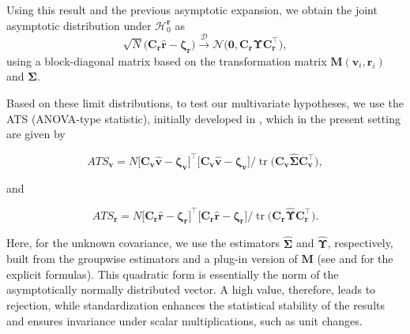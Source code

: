 Using this result and the previous asymptotic expansion, we obtain the joint
asymptotic distribution under \(\mathcal{H}_0^{\boldsymbol{r}}\) as
\begin{equation}
\sqrt{N}
\bigl(
\boldsymbol{C}_{\boldsymbol{r}} \widehat{\boldsymbol{r}}
- \boldsymbol{\zeta}_{\boldsymbol{r}}
\bigr)
\stackrel{\mathcal D}{\longrightarrow}
\mathcal{N}
\bigl(
\mathbf{0},
\boldsymbol{C}_{\boldsymbol{r}} \boldsymbol{\Upsilon} \boldsymbol{C}_{\boldsymbol{r}}^\top
\bigr),
\label{eq:cor-limit}
\end{equation}
using a block-diagonal matrix based on the transformation matrix
\(\boldsymbol{M}(\boldsymbol{v}_i, \boldsymbol{r}_i)\) and \(\boldsymbol{\Sigma}\).

Based on these limit distributions, to test our multivariate hypotheses, we use
the ATS (ANOVA-type statistic), initially developed in
\citet{brunner1997}, which in the present setting are given by

\begin{equation}
ATS_{\boldsymbol{v}}
=
N
\bigl[
\boldsymbol{C}_{\boldsymbol{v}}
\widehat{\boldsymbol{v}} - \boldsymbol{\zeta}_{\boldsymbol{v}}
\bigr]^\top
\bigl[
\boldsymbol{C}_{\boldsymbol{v}}
\widehat{\boldsymbol{v}} - \boldsymbol{\zeta}_{\boldsymbol{v}}
\bigr]
\Big/
\operatorname{tr}
\bigl(
\boldsymbol{C}_{\boldsymbol{v}} \widehat{\boldsymbol{\Sigma}} \boldsymbol{C}_{\boldsymbol{v}}^\top
\bigr),
\label{eq:ATS1}
\end{equation}

and

\begin{equation}
ATS_{\boldsymbol{r}}
=
N
\bigl[
\boldsymbol{C}_{\boldsymbol{r}}
\widehat{\boldsymbol{r}} - \boldsymbol{\zeta}_{\boldsymbol{r}}
\bigr]^\top
\bigl[
\boldsymbol{C}_{\boldsymbol{r}}
\widehat{\boldsymbol{r}} - \boldsymbol{\zeta}_{\boldsymbol{r}}
\bigr]
\Big/
\operatorname{tr}
\bigl(
\boldsymbol{C}_{\boldsymbol{r}} \widehat{\boldsymbol{\Upsilon}} \boldsymbol{C}_{\boldsymbol{r}}^\top
\bigr).
\label{eq:ATS2}
\end{equation}

Here, for the unknown covariance, we use the estimators
\(\widehat{\boldsymbol{\Sigma}}\) and \(\widehat{\boldsymbol{\Upsilon}}\), respectively, built from the
groupwise estimators and a plug-in version of \(\boldsymbol{M}\) (see
\citet{sattler2022} and \citet{sattler2023} for the explicit formulas).
This quadratic form is essentially the norm of the asymptotically normally
distributed vector. A high value, therefore, leads to rejection, while
standardization enhances the statistical stability of the results and ensures
invariance under scalar multiplications, such as unit changes.

